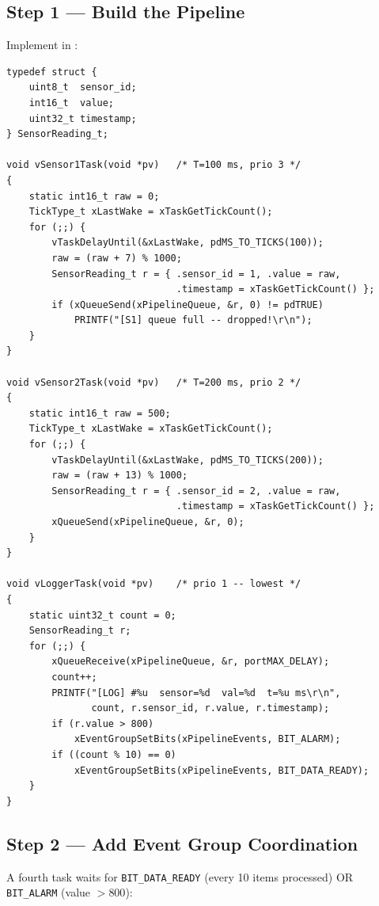 \documentclass[11pt, a4paper]{article}
\begin{document}
\subsection{Step 1 --- Build the Pipeline}

Implement in :

\begin{lstlisting}[style=cstyle]
typedef struct {
    uint8_t  sensor_id;
    int16_t  value;
    uint32_t timestamp;
} SensorReading_t;

void vSensor1Task(void *pv)   /* T=100 ms, prio 3 */
{
    static int16_t raw = 0;
    TickType_t xLastWake = xTaskGetTickCount();
    for (;;) {
        vTaskDelayUntil(&xLastWake, pdMS_TO_TICKS(100));
        raw = (raw + 7) % 1000;
        SensorReading_t r = { .sensor_id = 1, .value = raw,
                              .timestamp = xTaskGetTickCount() };
        if (xQueueSend(xPipelineQueue, &r, 0) != pdTRUE)
            PRINTF("[S1] queue full -- dropped!\r\n");
    }
}

void vSensor2Task(void *pv)   /* T=200 ms, prio 2 */
{
    static int16_t raw = 500;
    TickType_t xLastWake = xTaskGetTickCount();
    for (;;) {
        vTaskDelayUntil(&xLastWake, pdMS_TO_TICKS(200));
        raw = (raw + 13) % 1000;
        SensorReading_t r = { .sensor_id = 2, .value = raw,
                              .timestamp = xTaskGetTickCount() };
        xQueueSend(xPipelineQueue, &r, 0);
    }
}

void vLoggerTask(void *pv)    /* prio 1 -- lowest */
{
    static uint32_t count = 0;
    SensorReading_t r;
    for (;;) {
        xQueueReceive(xPipelineQueue, &r, portMAX_DELAY);
        count++;
        PRINTF("[LOG] #%u  sensor=%d  val=%d  t=%u ms\r\n",
               count, r.sensor_id, r.value, r.timestamp);
        if (r.value > 800)
            xEventGroupSetBits(xPipelineEvents, BIT_ALARM);
        if ((count % 10) == 0)
            xEventGroupSetBits(xPipelineEvents, BIT_DATA_READY);
    }
}
\end{lstlisting}

\subsection{Step 2 --- Add Event Group Coordination}

A fourth task waits for \texttt{BIT\_DATA\_READY} (every 10 items processed) OR
\texttt{BIT\_ALARM} (value $> 800$):
\end{document}
